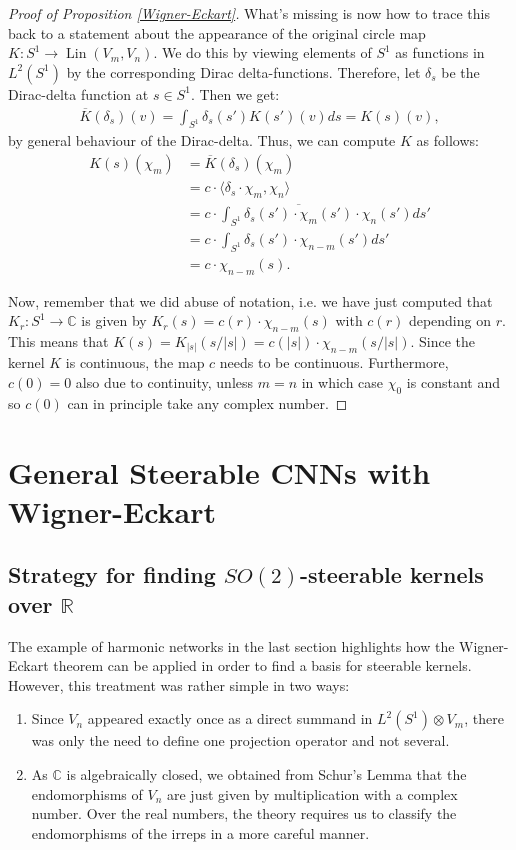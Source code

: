 \documentclass[12pt, a4paper]{article}
\theoremstyle{plain}
\theoremstyle{definition}
\theoremstyle{remark}
\newcommand{\R}{\mathds{R}}
\newcommand{\C}{\mathds{C}}
\DeclareMathOperator{\lin}{Lin}
\begin{document}
\begin{proof}[Proof of Proposition \ref{Wigner-Eckart}]
What's missing is now how to trace this back to a statement about the appearance of the original circle map $K: S^1 \to \lin(V_m, V_n)$. We do this by viewing elements of $S^1$ as functions in $L^2(S^1)$ by the corresponding Dirac delta-functions. Therefore, let $\delta_s$ be the Dirac-delta function at $s \in S^1$. Then we get:
\begin{align*}
\overline{K}(\delta_s)(v) = \int_{S^1} \delta_s(s') K(s')(v)ds = K(s)(v),
\end{align*}
by general behaviour of the Dirac-delta. Thus, we can compute $K$ as follows:
\begin{align*}
K(s)(\chi_m) & = \overline{K}(\delta_s)(\chi_m) \\
& = c \cdot \langle \delta_s \cdot \chi_m , \chi_n \rangle \\
& = c \cdot \int_{S^1} \overline{\delta_s(s')\cdot \chi_m(s')} \cdot \chi_n(s') ds' \\
& = c \cdot \int_{S^1} \delta_s(s') \cdot \chi_{n-m}(s') ds' \\
& = c \cdot \chi_{n - m}(s).
\end{align*}

Now, remember that we did abuse of notation, i.e. we have just computed that $K_r: S^1 \to \C$ is given by $K_r(s) = c(r) \cdot \chi_{n-m}(s)$ with $c(r)$ depending on $r$. This means that $K(s) = K_{|s|}(s/|s|) = c(|s|) \cdot \chi_{n-m}(s/|s|)$. Since the kernel $K$ is continuous, the map $c$ needs to be continuous. Furthermore, $c(0) = 0$ also due to continuity, unless $m = n$ in which case $\chi_0$ is constant and so $c(0)$ can in principle take any complex number.

\end{proof}

\section{General Steerable CNNs with Wigner-Eckart}

\subsection{Strategy for finding $SO(2)$-steerable kernels over $\R$}

The example of harmonic networks in the last section highlights how the Wigner-Eckart theorem can be applied in order to find a basis for steerable kernels. However, this treatment was rather simple in two ways:

\begin{enumerate}
\item Since $V_n$ appeared exactly once as a direct summand in $L^2(S^1) \otimes V_m$, there was only the need to define one projection operator and not several.
\item As $\C$ is algebraically closed, we obtained from Schur's Lemma that the endomorphisms of $V_n$ are just given by multiplication with a complex number. Over the real numbers, the theory requires us to classify the endomorphisms of the irreps in a more careful manner.
\end{enumerate}
\end{document}
